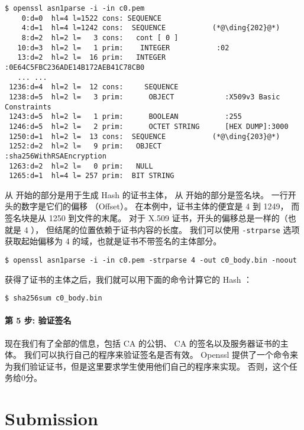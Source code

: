 \begin{lstlisting}
$ openssl asn1parse -i -in c0.pem
    0:d=0  hl=4 l=1522 cons: SEQUENCE
    4:d=1  hl=4 l=1242 cons:  SEQUENCE           (*@\ding{202}@*)
    8:d=2  hl=2 l=   3 cons:   cont [ 0 ]
   10:d=3  hl=2 l=   1 prim:    INTEGER           :02
   13:d=2  hl=2 l=  16 prim:   INTEGER           :0E64C5FBC236ADE14B172AEB41C78CB0
   ... ...
 1236:d=4  hl=2 l=  12 cons:     SEQUENCE
 1238:d=5  hl=2 l=   3 prim:      OBJECT            :X509v3 Basic Constraints
 1243:d=5  hl=2 l=   1 prim:      BOOLEAN           :255
 1246:d=5  hl=2 l=   2 prim:      OCTET STRING      [HEX DUMP]:3000
 1250:d=1  hl=2 l=  13 cons:  SEQUENCE           (*@\ding{203}@*)
 1252:d=2  hl=2 l=   9 prim:   OBJECT            :sha256WithRSAEncryption
 1263:d=2  hl=2 l=   0 prim:   NULL
 1265:d=1  hl=4 l= 257 prim:  BIT STRING
\end{lstlisting}


从  开始的部分是用于生成 Hash 的证书主体，
从  开始的部分是签名块。
一行开头的数字是它们的偏移 （Offset）。
在本例中，证书主体的便宜是 4 到 1249，
而签名块是从 1250 到文件的末尾。
对于 X.509 证书，开头的偏移总是一样的（也就是 4 ），
但结尾的位置依赖于证书内容的长度。
我们可以使用 \texttt{-strparse} 选项获取起始偏移为 4 的域，也就是证书不带签名的主体部分。

\begin{lstlisting}
$ openssl asn1parse -i -in c0.pem -strparse 4 -out c0_body.bin -noout
\end{lstlisting}

获得了证书的主体之后，我们就可以用下面的命令计算它的 Hash ：

\begin{lstlisting}
$ sha256sum c0_body.bin
\end{lstlisting}



\paragraph{第 5 步: 验证签名}
现在我们有了全部的信息，包括 CA 的公钥、 CA 的签名以及服务器证书的主体。
我们可以执行自己的程序来验证签名是否有效。
Openssl 提供了一个命令来为我们验证证书，但是这里要求学生使用他们自己的程序来实现。
否则，这个任务给0分。


\section{Submission}





